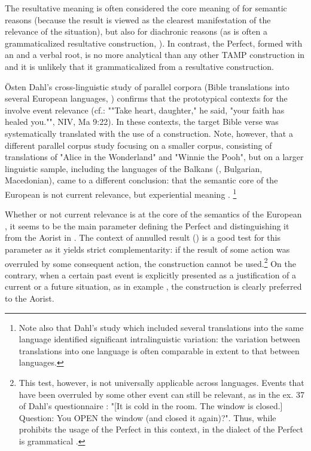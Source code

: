 \documentclass[output=paper]{LSP/langsci}
\begin{document}
The resultative meaning is often considered the core meaning of  for semantic reasons (because the result is viewed as the clearest manifestation of the relevance of the situation), but also for diachronic reasons (as  is often a grammaticalized resultative construction, \citealt{khachplung2016}). In contrast, the  Perfect, formed with an  and a verbal root, is no more analytical than any other TAMP construction in  and it is unlikely that it grammaticalized from a resultative construction. 

Östen Dahl's cross-linguistic study of parallel corpora (Bible translations into several European languages, \citealt{khachdahl2014}) confirms that the prototypical contexts for the  involve event relevance (cf.: ""Take heart, daughter," he said, "your faith has healed you."", NIV, Ma 9:22). In these contexts, the target Bible verse was systematically translated with the use of a  construction. Note, however, that a different parallel corpus study focusing on a smaller corpus, consisting of translations of "Alice in the Wonderland" and "Winnie the Pooh", but on a larger linguistic sample, including the languages of the Balkans (, Bulgarian, Macedonian), came to a different conclusion: that the semantic core of the European  is not current relevance, but experiential meaning \citep{khachsich2016}. \footnote{Note also that Dahl's study which included several translations into the same language identified significant intralinguistic variation: the variation between translations into one language is often comparable in extent to that between languages.}

Whether or not current relevance is at the core of the semantics of the European , it seems to be the main parameter defining the Perfect and distinguishing it from the Aorist in . The context of annulled result () is a good test for this parameter as it yields strict complementarity: if the result of some action was overruled by some consequent action, the  construction cannot be used.\footnote{This test, however, is not universally applicable across languages. Events that have been overruled by some other event can still be relevant, as in the ex. 37 of Dahl's questionnaire \citep[803]{khachdahl2000}: "[It is cold in the room. The window is closed.] Question: You OPEN the window (and closed it again)?". Thus, while  prohibits the usage of the Perfect in this context, in the  dialect of  the Perfect is grammatical \citep{khachmaisak2016}.} On the contrary, when a certain past event is explicitly presented as a justification of a current or a future situation, as in example , the  construction is clearly preferred to the Aorist.
\end{document}

